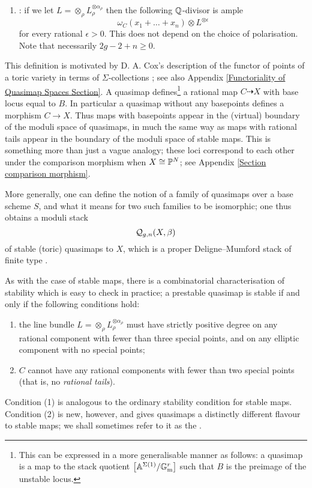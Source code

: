 \begin{definition}
\begin{enumerate}
\item {}: if we let $L = \otimes_\rho L_\rho^{\otimes \alpha_\rho}$ then the following $\mathbb{Q}$-divisor is ample
\begin{equation*} \omega_C(x_1 + \ldots + x_n)\otimes L^{\otimes \epsilon} \end{equation*}
for every rational $\epsilon > 0$.  This does not depend on the choice of polarisation. Note that necessarily $2g-2+n \geq 0$.
\end{enumerate}
\end{definition}

\begin{remark} This definition is motivated by D. A. Cox's description of the functor of points of a toric variety in terms of $\Sigma$-collections \cite{CoxFunctor}; see also Appendix \ref{Functoriality of Quasimap Spaces Section}. A quasimap defines\footnote{This can be expressed in a more generalisable manner as follows: a quasimap is a map to the stack quotient $\big[\mathbb{A}^{\Sigma(1)} / \mathbb{G}_{\text{m}}^r\big]$ such that $B$ is the preimage of the unstable locus.} a rational map $C \dashrightarrow X$ with base locus equal to $B$.
In particular a quasimap without any basepoints defines a morphism $C \to X$. Thus maps with basepoints appear in the (virtual) boundary of the moduli space of quasimaps, in much the same way as maps with rational tails appear in the boundary of the moduli space of stable maps. This is something more than just a vague analogy; these loci correspond to each other under the comparison morphism when $X\cong\mathbb P^N$; see Appendix \ref{Section comparison morphism}. \end{remark}

More generally, one can define the notion of a family of quasimaps over a base scheme $S$, and what it means for two such families to be isomorphic; one thus obtains a moduli stack
\begin{equation*} \mathcal{Q}_{g,n}(X,\beta) \end{equation*}
of stable (toric) quasimaps to $X$, which is a proper Deligne--Mumford stack of finite type \cite[\S 3]{CF-K}.

\medskip

As with the case of stable maps, there is a combinatorial characterisation of stability which is easy to check in practice; a prestable quasimap is stable if and only if the following conditions hold:
\begin{enumerate}
\item the line bundle $L = \otimes_\rho L_\rho^{\otimes \alpha_\rho}$ must have strictly positive degree on any rational component with fewer than three special points, and on any elliptic component with no special points;
\item $C$ cannot have any rational components with fewer than two special points (that is, no \emph{rational tails}).
\end{enumerate}
Condition (1) is analogous to the ordinary stability condition for stable maps. Condition (2) is new, however, and gives quasimaps a distinctly different flavour to stable maps; we shall sometimes refer to it as the . 

